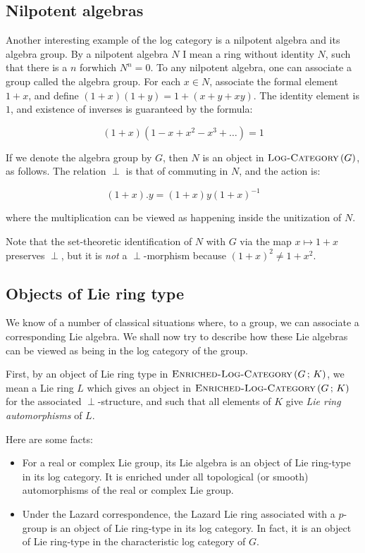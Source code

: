 \documentclass[a4paper]{amsart}
\newcommand{\logcategory}[1]{\textsc{Log-Category}\left(#1\right)}
\newcommand{\enrichedlogcategory}[2]{\textsc{Enriched-Log-Category}\left(#1 \, ; \, #2\right)}
\begin{document}
\subsection{Nilpotent algebras}

Another interesting example of the log category is a nilpotent algebra
and its algebra group. By a nilpotent algebra $N$ I mean a ring
without identity $N$, such that there is a $n$ forwhich $N^n = 0$. To
any nilpotent algebra, one can associate a group called the algebra
group. For each $x \in N$, associate the formal element $1 + x$, and
define $(1 + x)(1 + y) = 1 + (x + y + xy)$. The identity element is
$1$, and existence of inverses is guaranteed by the formula:

$$(1 + x)(1 - x + x^2 - x^3 + \ldots) = 1$$

If we denote the algebra group by $G$, then $N$ is an object in
$\logcategory{G}$, as follows. The relation $\perp$ is that of commuting
in $N$, and the action is:

$$(1 + x).y = (1 + x)y(1 + x)^{-1}$$

where the multiplication can be viewed as happening inside the
unitization of $N$.

Note that the set-theoretic identification of $N$ with $G$ via the map
$x \mapsto 1 + x$ preserves $\perp$, but it is {\em not} a
$\perp$-morphism because $(1 + x)^2 \ne 1 + x^2$.

\subsection{Objects of Lie ring type}

We know of a number of classical situations where, to a group, we can
associate a corresponding Lie algebra. We shall now try to describe
how these Lie algebras can be viewed as being in the log category of
the group.

First, by an object of Lie ring type in $\enrichedlogcategory{G}{K}$,
we mean a Lie ring $L$ which gives an object in
$\enrichedlogcategory{G}{K}$ for the associated $\perp$-structure, and
such that all elements of $K$ give {\em Lie ring automorphisms} of
$L$.

Here are some facts:

\begin{itemize}

\item For a real or complex Lie group, its Lie algebra is an object of
  Lie ring-type in its log category. It is enriched under all
  topological (or smooth) automorphisms of the real or complex Lie
  group.

\item Under the Lazard correspondence, the Lazard Lie ring associated
  with a $p$-group is an object of Lie ring-type in its log category.
  In fact, it is an object of Lie ring-type in the characteristic log
  category of $G$.

\end{itemize}
\end{document}
